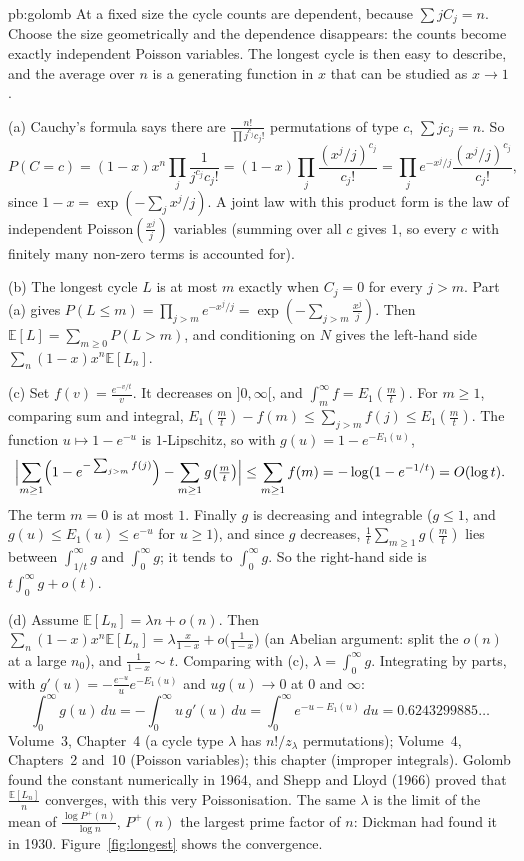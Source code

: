\begin{solution}{pb:golomb}
\idea At a fixed size the cycle counts are dependent, because $\sum jC_j=n$. Choose the size geometrically and the dependence disappears: the counts become exactly independent Poisson variables. The longest cycle is then
easy to describe, and the average over $n$ is a generating function in $x$ that can be studied as $x\to1$.

\writeup (a) Cauchy's formula says there are $\frac{n!}{\prod j^{c_j}c_j!}$ permutations of type $c$, $\sum jc_j=n$. So
\[
P(C=c)=(1-x)x^n\prod_j\frac1{j^{c_j}c_j!}=(1-x)\prod_j\frac{(x^j/j)^{c_j}}{c_j!}=\prod_je^{-x^j/j}\frac{(x^j/j)^{c_j}}{c_j!},
\]
since $1-x=\exp(-\sum_jx^j/j)$. A joint law with this product form is the law of independent Poisson$(\frac{x^j}j)$
variables (summing over all $c$ gives $1$, so every $c$ with finitely many non-zero terms is accounted for).

(b) The longest cycle $L$ is at most $m$ exactly when $C_j=0$ for every $j>m$. Part (a) gives
$P(L\le m)=\prod_{j>m}e^{-x^j/j}=\exp(-\sum_{j>m}\frac{x^j}j)$. Then $\mathbb E[L]=\sum_{m\ge0}P(L>m)$, and conditioning on $N$
gives the left-hand side $\sum_n(1-x)x^n\mathbb E[L_n]$.

(c) Set $f(v)=\frac{e^{-v/t}}v$. It decreases on $]0,\infty[$, and $\int_m^\infty f=E_1(\frac mt)$. For $m\ge1$, comparing sum and
integral, $E_1(\frac mt)-f(m)\le\sum_{j>m}f(j)\le E_1(\frac mt)$. The function $u\mapsto1-e^{-u}$ is $1$-Lipschitz, so with
$g(u)=1-e^{-E_1(u)}$,
\[
\Bigl|\sum_{m\ge1}\Bigl(1-e^{-\sum_{j>m}f(j)}\Bigr)-\sum_{m\ge1}g\bigl(\tfrac mt\bigr)\Bigr|\le\sum_{m\ge1}f(m)=-\log(1-e^{-1/t})=O(\log t).
\]
The term $m=0$ is at most $1$. Finally $g$ is decreasing and integrable ($g\le1$, and $g(u)\le E_1(u)\le e^{-u}$ for $u\ge1$),
and since $g$ decreases, $\frac1t\sum_{m\ge1}g(\frac mt)$ lies between $\int_{1/t}^\infty g$ and $\int_0^\infty g$; it tends to $\int_0^\infty g$. So the right-hand side is
$t\int_0^\infty g+o(t)$.

(d) Assume $\mathbb E[L_n]=\lambda n+o(n)$. Then $\sum_n(1-x)x^n\mathbb E[L_n]=\lambda\frac x{1-x}+o\bigl(\frac1{1-x}\bigr)$ (an
Abelian argument: split the $o(n)$ at a large $n_0$), and $\frac1{1-x}\sim t$. Comparing with (c), $\lambda=\int_0^\infty g$.
Integrating by parts, with $g'(u)=-\frac{e^{-u}}ue^{-E_1(u)}$ and $ug(u)\to0$ at $0$ and $\infty$:
\[
\int_0^\infty g(u)\,du=-\int_0^\infty u\,g'(u)\,du=\int_0^\infty e^{-u-E_1(u)}\,du=0.6243299885\ldots
\]
\tools Volume~3, Chapter~4 (a cycle type $\lambda$ has $n!/z_\lambda$ permutations); Volume~4, Chapters~2 and~10 (Poisson variables); this chapter (improper integrals).
\leads Golomb found the constant numerically in 1964, and Shepp and Lloyd (1966) proved that $\frac{\mathbb E[L_n]}n$ converges,
with this very Poissonisation. The same $\lambda$ is the limit of the mean of $\frac{\log P^+(n)}{\log n}$, $P^+(n)$ the largest prime
factor of $n$: Dickman had found it in 1930. Figure~\ref{fig:longest} shows the convergence.
\end{solution}

